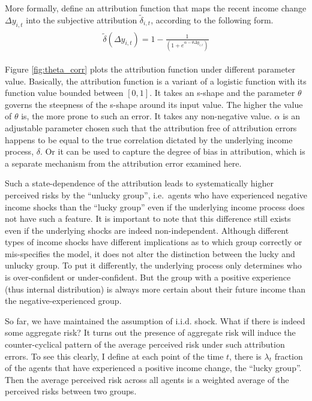 \documentclass[12pt,notitlepage,onecolumn,aps,pra]{article}
\begin{document}
More formally, define an attribution function that maps the recent
income change \(\Delta y_{i,t}\) into the subjective attribution
\(\tilde \delta_{i,t}\), according to the following form.
\begin{eqnarray}
\begin{split}
\tilde \delta(\Delta y_{i,t}) = 1- \frac{1}{(1+e^{\alpha-\theta \Delta y_{i,t}})}
\end{split}
\end{eqnarray}

Figure \ref{fig:theta_corr} plots the attribution function under
different parameter value. Basically, the attribution function is a
variant of a logistic function with its function value bounded between
\([0,1]\). It takes an s-shape and the parameter \(\theta\) governs the
steepness of the s-shape around its input value. The higher the value of
\(\theta\) is, the more prone to such an error. It takes any
non-negative value. \(\alpha\) is an adjustable parameter chosen such
that the attribution free of attribution errors happens to be equal to
the true correlation dictated by the underlying income process,
\(\delta\). Or it can be used to capture the degree of bias in
attribution, which is a separate mechanism from the attribution error
examined here.

Such a state-dependence of the attribution leads to systematically
higher perceived risks by the ``unlucky group'', i.e.~agents who have
experienced negative income shocks than the ``lucky group'' even if the
underlying income process does not have such a feature. It is important
to note that this difference still exists even if the underlying shocks
are indeed non-independent. Although different types of income shocks
have different implications as to which group correctly or mis-specifies
the model, it does not alter the distinction between the lucky and
unlucky group. To put it differently, the underlying process only
determines who is over-confident or under-confident. But the group with
a positive experience (thus internal distribution) is always more
certain about their future income than the negative-experienced group.

So far, we have maintained the assumption of i.i.d. shock. What if there
is indeed some aggregate risk? It turns out the presence of aggregate
risk will induce the counter-cyclical pattern of the average perceived
risk under such attribution errors. To see this clearly, I define at
each point of the time \(t\), there is \(\lambda_t\) fraction of the
agents that have experienced a positive income change, the ``lucky
group''. Then the average perceived risk across all agents is a weighted
average of the perceived risks between two groups.
\end{document}
